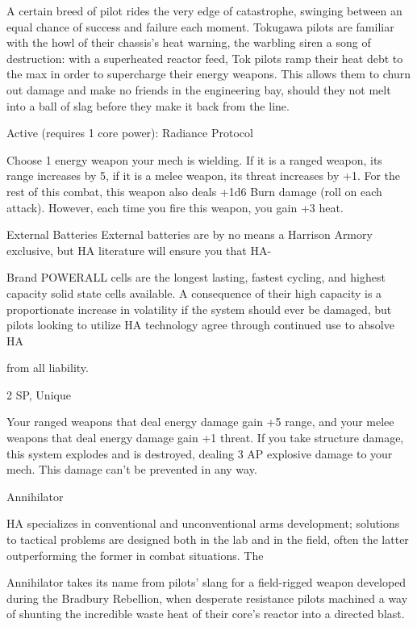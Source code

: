   A certain breed of pilot rides the very edge of catastrophe, swinging between an equal chance of  
  success and failure each moment. Tokugawa pilots are familiar with the howl of their chassis’s heat  
  warning, the warbling siren a song of destruction: with a superheated reactor feed, Tok pilots ramp their  
  heat debt to the max in order to supercharge their energy weapons. This allows them to churn out  
  damage and make no friends in the engineering bay, should they not melt into a ball of slag before they  
  make it back from the line.   

  Active (requires 1 core power):   
  Radiance  
  Protocol
 
  Choose 1 energy weapon your mech is wielding. If it is a ranged weapon, its range increases by 5, if it  
  is a melee weapon, its threat increases by +1. For the rest of this combat, this weapon also deals +1d6  
  Burn damage (roll on each attack). However, each time you fire this weapon, you gain +3 heat. 

External Batteries  
External batteries are by no means a Harrison Armory exclusive, but HA literature will ensure you that HA- 

Brand POWERALL cells are the longest lasting, fastest cycling, and highest capacity solid state cells  
available. A consequence of their high capacity is a proportionate increase in volatility if the system should  
ever be damaged, but pilots looking to utilize HA technology agree through continued use to absolve HA  

from all liability.   

2 SP, Unique
 

                                                                                                                     


Your ranged weapons that deal energy damage gain +5 range, and your melee weapons that  
deal energy damage gain +1 threat. If you take structure damage, this system explodes and is  
destroyed, dealing 3 AP explosive damage to your mech. This damage can’t be prevented in any  
way.
 

Annihilator  

HA specializes in conventional and unconventional arms development; solutions to tactical problems are  
designed both in the lab and in the field, often the latter outperforming the former in combat situations. The  

Annihilator takes its name from pilots’ slang for a field-rigged weapon developed during the Bradbury  
Rebellion, when desperate resistance pilots machined a way of shunting the incredible waste heat of their  
core’s reactor into a directed blast.   


